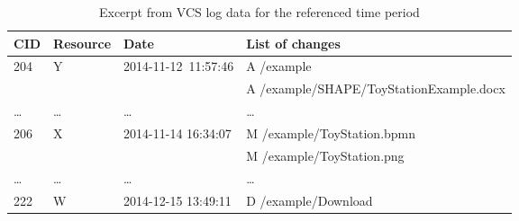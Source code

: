 \begin{table}\scriptsize
\caption{Excerpt from VCS log data for the referenced time period }
\label{tab:example}

\renewcommand{\arraystretch}{1.3}
\centering
\begin{tabular}{m{.8cm} m{1.5cm} m{3cm} p{5.8cm}}
\textbf{CID}	 & \textbf{Resource} & \textbf{Date} & \textbf{List of changes} \\
\hline 
\hline

\multirow{2}{*}{204} & \multirow{2}{*}{Y} & \multirow{2}{*}{2014-11-12~11:57:46} & A /example \\
& & & A \slash example\slash SHAPE\slash\-ToyStation\-Example.docx \\ \hline %


\ldots & \ldots & \ldots & \ldots \\ \hline

\multirow{2}{*}{206} & \multirow{2}{*}{X} & \multirow{2}{*}{2014-11-14 16:34:07} & M /example/ToyStation.bpmn\\
& & & M /example/ToyStation.png \\ \hline %


\ldots & \ldots & \ldots & \ldots \\ \hline

222 & W & 2014-12-15 13:49:11 & D /example/Download \\ \hline %


\end{tabular}
\end{table}
